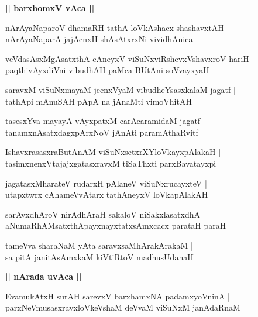 \documentclass[twoside,12pt,openright]{book}
\newcounter{shloka}[chapter]
\def\uvaca#1{\centerline{{\large\textbf{#1}}}}
\begin{document}
\uvaca{|| barxhomxV vAca ||}

\begin{shloka}%
nArAyaNaparoV dhamaRH tathA loVkAshacx shashavxtAH |\\
nArAyaNaparA jajAcnxH shAsAtxrxNi vividhAnica 
\end{shloka}

\begin{shloka}%
veVdasAsxMgAsatxthA cAneyxV viSuNxviRshevxVshavxroV hariH |\\
paqthivAyxdiVni vibudhAH paMca BUtAni soVvayxyaH 
\end{shloka}

\begin{shloka}%
saravxM viSuNxmayaM jecnxVyaM vibudheYsasxkalaM jagatf |\\
tathApi mAnuSAH pApA na jAnaMti vimoVhitAH 
\end{shloka}

\begin{shloka}%
tasesxYva mayayA vAyxpatxM carAcaramidaM jagatf |\\
tanamxnAsatxdagxpArxNoV jAnAti paramAthaRvitf
\end{shloka}

\begin{shloka}%
IshavxrasasxraButAnAM viSuNxsetxrXYloVkayxpAlakaH |\\
tasimxnenxVtajajxgatasxravxM tiSaThxti parxBavatayxpi
\end{shloka}

\begin{shloka}%
jagatasxMharateV rudarxH pAlaneV viSuNxrucayxteV |\\
utapxtwrx cAhameVvAtarx tathAneyxV loVkapAlakAH 
\end{shloka}

\begin{shloka}%
sarAvxdhAroV nirAdhAraH sakaloV niSakxlasatxdhA |\\
aNumaRhAMsatxthApayxnayxtatxsAmxcacx parataH paraH 
\end{shloka}

\begin{shloka}%
tameVva sharaNaM yAta saravxsaMhArakArakaM |\\
sa pitA janitAsAmxkaM kiVtiRtoV madhusUdanaH 
\end{shloka}

\uvaca{|| nArada uvAca ||}

\begin{shloka}%
EvamukAtxH surAH sarevxV barxhamxNA padamxyoVninA |\\
parxNeVmusasxravxloVkeVshaM deVvaM viSuNxM janAdaRnaM 
\end{shloka}
\end{document}
